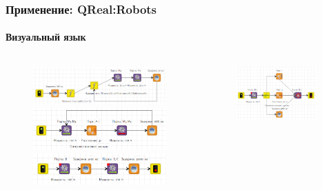\documentclass[14pt]{beamer}
\begin{document}
\begin{frame}
    \frametitle{Применение: QReal:Robots}
    \framesubtitle{Визуальный язык}
    \begin{columns}[onlytextwidth]
       \begin{column}{0.5\textwidth}
            \begin{figure}
            	\begin{center}
             		\includegraphics[width=\textwidth]{images/presentation/language1.png}\\
             		\vspace{0.5cm}\includegraphics[width=\textwidth]{images/presentation/language2.png}\\
             		\vspace{0.5cm}\includegraphics[width=\textwidth]{images/presentation/language4.png}
            	\end{center}
            \end{figure}
        \end{column}
        \begin{column}{0.5\textwidth}
            \begin{figure}
            	\begin{center}
             		\includegraphics[width=0.9\textwidth]{images/presentation/language3.png}

\end{center}
\end{figure}
\end{column}
\end{columns}
\end{frame}
\end{document}
